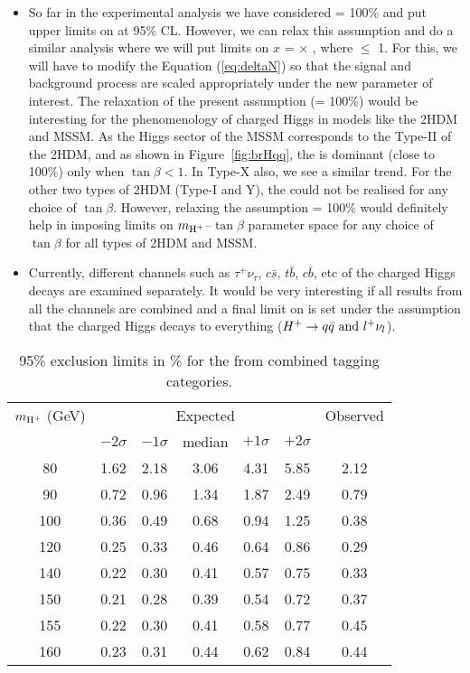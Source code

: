 \begin{itemize}[leftmargin=*]
\item So far in the experimental analysis we have considered \brHcs = 100\% and put upper limits
on \brThb at 95\% CL. However, we can relax this assumption and do a similar analysis where
we will put limits on $x$ = \brThb $\times$ \brHcs, where \brHcs $\leq$ 1. For this, we will have 
to modify the Equation (\ref{eq:deltaN}) so that the signal and background process are scaled 
appropriately under the new parameter of interest. The relaxation of the
present assumption (\brHcs = 100\%) would be interesting for the phenomenology of charged Higgs 
in models like the 2HDM and MSSM. As the Higgs sector of the MSSM corresponds to the Type-II of 
the 2HDM, and as shown in Figure~\ref{fig:brHqq}, the \brHcs is dominant (\ie close to 100\%) 
only when $\tan\beta < 1$. In Type-X also, we see a similar trend. For the other two types 
of 2HDM (Type-I and Y), the \brHcs could not be realised for any choice of $\tan\beta$. However,
relaxing the assumption \brHcs = 100\% would definitely help in imposing limits on 
$\mHp$--$\tan\beta$ parameter space for any choice of $\tan\beta$ for all types of 2HDM and MSSM.

\item Currently, different channels such as $\tau^+\nu_\tau$, $c\bar{s}$, $t\bar{b}$, $c\bar{b}$, etc 
of the charged Higgs decays are examined separately. It would be very interesting if all results from
all the channels are combined and a final limit on \brThb is set under the assumption that the charged
Higgs decays to everything ($H^+ \to q\bar{q} \rm{ and } l^+\nu_l$).  
\end{itemize}

\begin{table}
\caption{95\% \CL exclusion limits in \% for the \mujets from combined \PQc tagging categories.}
\label{tab:limit_muon}
\begin{center}
\begin{tabular}{ccccccc}
\hline
\hline
\multicolumn{1}{c}{$\mHp$ (GeV)} & \multicolumn{5}{c}{{Expected}} & \multicolumn{1}{c}{{Observed}} \\
&\multicolumn{1}{c}{$-2\sigma$} &\multicolumn{1}{c}{$-1\sigma$} &\multicolumn{1}{c}{median} & \multicolumn{1}{c}{$+1\sigma$} & \multicolumn{1}{c}{$+2\sigma$}&\\ \hline
\hline
80  & 1.62 & 2.18 & 3.06 & 4.31 & 5.85 & 2.12\\
90  & 0.72 & 0.96 & 1.34 & 1.87 & 2.49 & 0.79\\
100 & 0.36 & 0.49 & 0.68 & 0.94 & 1.25 & 0.38\\
120 & 0.25 & 0.33 & 0.46 & 0.64 & 0.86 & 0.29\\
140 & 0.22 & 0.30 & 0.41 & 0.57 & 0.75 & 0.33\\
150 & 0.21 & 0.28 & 0.39 & 0.54 & 0.72 & 0.37\\
155 & 0.22 & 0.30 & 0.41 & 0.58 & 0.77 & 0.45\\
160 & 0.23 & 0.31 & 0.44 & 0.62 & 0.84 & 0.44\\
\hline
\end{tabular}
\end{center}
\end{table}

